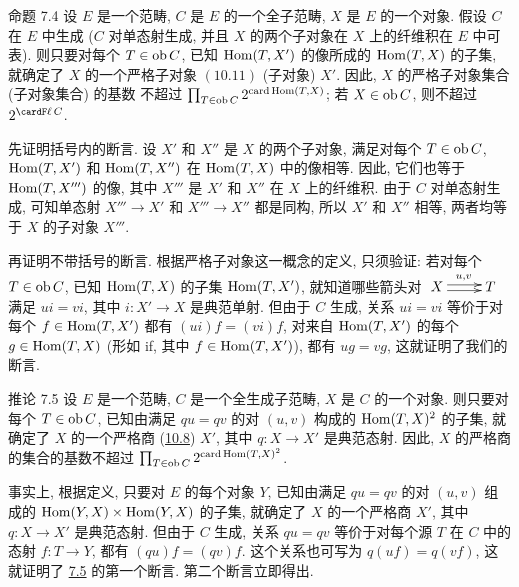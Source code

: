 \begin{enonce*}{命题 7.4}
设 $E$ 是一个范畴, $C$ 是 $E$ 的一个全子范畴,
$X$ 是 $E$ 的一个对象. 假设 $C$ 在 $E$ 中生成
(\resp $C$ 对单态射生成, 并且 $X$ 的两个子对象在 $X$ 上的纤维积在 $E$ 中可表).
则只要对每个 $T\in \operatorname{ob} C$, 已知 $\operatorname{Hom}(T,X')$ 的像所成的
$\operatorname{Hom}(T,X)$ 的子集, 就确定了 $X$ 的一个严格子对象
$\hyperref[I.sec10.11]{(10.11)}$ (\resp 子对象) $X'$.
因此, $X$ 的严格子对象集合 (\resp 子对象集合) 的基数
不超过 $\prod_{T\in \operatorname{ob} C} 2^{\operatorname{card} \operatorname{Hom}(T,X)}$;
若 $X\in \operatorname{ob} C$, 则不超过 $2^{\card%
F\ell\,C}$.
\end{enonce*}

先证明括号内的断言. 设 $X'$ 和 $X''$ 是 $X$ 的两个子对象,
满足对每个 $T\in \operatorname{ob} C$, $\operatorname{Hom}(T,X')$ 和 $\operatorname{Hom}(T,X'')$
在 $\operatorname{Hom}(T,X)$ 中的像相等.
因此, 它们也等于 $\operatorname{Hom}(T,X''')$ 的像,
其中 $X'''$ 是 $X'$ 和 $X''$ 在 $X$ 上的纤维积.
由于 $C$ 对单态射生成, 可知单态射\pageoriginale
$X'''\rightarrow X'$ 和 $X'''\rightarrow X''$ 都是同构,
所以 $X'$ 和 $X''$ 相等, 两者均等于 $X$ 的子对象 $X'''$.

再证明不带括号的断言. 根据严格子对象这一概念的定义,
只须验证: 若对每个 $T\in\operatorname{ob} C$, 已知 $\operatorname{Hom}(T,X)$ 的子集 $\operatorname{Hom}(T,X')$,
就知道哪些箭头对 $\xymatrix{
X\ar@<2pt>[r]^{u,v}\ar@<-2pt>[r]& T }$ 满足 $ui=vi$,
其中 $i:X'\rightarrow X$ 是典范单射.
但由于 $C$ 生成, 关系 $ui=vi$ 等价于对每个 $f\in \operatorname{Hom}(T,X')$
都有 $(ui)f=(vi)f$,
\ie 对来自 $\operatorname{Hom}(T,X')$ 的每个 $g\in \operatorname{Hom}(T,X)$
(\ie 形如 if, 其中 $f\in \operatorname{Hom}(T,X')$), 都有 $ug=vg$,
这就证明了我们的断言.

\begin{enonce*}{推论 7.5}
设 $E$ 是一个范畴, $C$ 是一个全生成子范畴, $X$ 是 $C$ 的一个对象.
则只要对每个 $T\in \operatorname{ob} C$, 已知由满足 $qu=qv$ 的对 $(u,v)$
构成的 $\operatorname{Hom}(T,X)^2$ 的子集, 就确定了 $X$ 的一个严格商
(\hyperref[I.sec10.8]{10.8}) $X'$, 其中 $q:X\rightarrow X'$ 是典范态射.
因此, $X$ 的严格商的集合的基数不超过
$\prod_{T\in \operatorname{ob} C} 2^{\operatorname{card}\operatorname{Hom}(T,X)^2}$.
\end{enonce*}

事实上, 根据定义, 只要对 $E$ 的每个对象 $Y$,
已知由满足 $qu=qv$ 的对 $(u,v)$ 组成的
$\operatorname{Hom}(Y,X)\times \operatorname{Hom}(Y,X)$ 的子集,
就确定了 $X$ 的一个严格商 $X'$, 其中 $q:X\rightarrow X'$ 是典范态射.
但由于 $C$ 生成, 关系 $qu=qv$ 等价于对每个源 $T$ 在 $C$ 中的态射
$f:T\rightarrow Y$, 都有 $(qu)f=(qv)f$.
这个关系也可写为 $q(uf)=q(vf)$, 这就证明了
\hyperref[I.cor7.5]{7.5} 的第一个断言. 第二个断言立即得出.

\setcounter{subsection}{5} \setcounter{subsubsection}{0}


